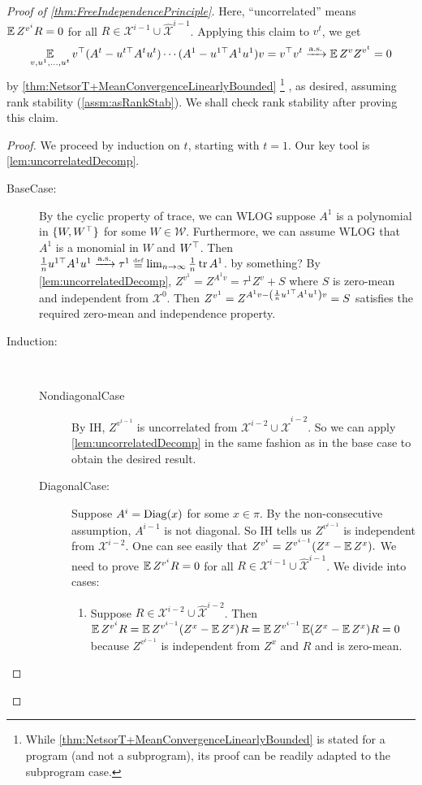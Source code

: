 \documentclass[main.tex]{subfiles}
\begin{document}
\begin{proof}[Proof of \cref{thm:FreeIndependencePrinciple}]
Here, ``uncorrelated'' means $\operatorname*{\mathbb{E}} Z^{v^{i}}R=0$ for all $R\in\mathcal{X}^{i-1}\cup\hat{\mathcal{X}}^{i-1}$. Applying this claim to $v^{t}$, we get
\[
\operatorname*{\mathbb{E}}_{v, u^1, \ldots, u^t} v^{\top}(A^{t}-u^{t\top}A^{t}u^{t})\cdots(A^{1}-u^{1\top}A^{1}u^{1})v=v^{\top}v^{t}\xrightarrow{\mathrm{a.s.}}\operatorname*{\mathbb{E}} Z^{v}Z^{v^{t}}=0
\]
by \cref{thm:NetsorT+MeanConvergenceLinearlyBounded}%
\footnote{
    While \cref{thm:NetsorT+MeanConvergenceLinearlyBounded} is stated for a program (and not a subprogram), its proof can be readily adapted to the subprogram case.
}
, as desired, assuming rank stability (\cref{assm:asRankStab}). We shall check rank stability after proving this claim.
\begin{proof}
We proceed by induction on $t$, starting with $t=1$. Our key tool is \cref{lem:uncorrelatedDecomp}.
\begin{description}
\item [{BaseCase:}] By the cyclic property of trace, we can WLOG suppose $A^{1}$ is a polynomial in $\{W,W^{\top}\}$ for some $W\in\mathcal{W}$. Furthermore, we can assume WLOG that $A^{1}$ is a monomial in $W$ and $W^{\top}$. Then $\frac{1}{n}u^{1\trsp}A^{1}u^{1}\asto\tau^{1}\defeq\lim_{n\to\infty}\frac{1}{n}\tr A^{1}$. by something? By \cref{lem:uncorrelatedDecomp}, $Z^{v^{1}}=Z^{A^{1}v}=\tau^{1}Z^{v}+S$ where $S$ is zero-mean and independent from $\mathcal{X}^{0}$. Then $Z^{v^{1}}=Z^{A^{1}v-\left(\frac{1}{n}u^{1\top}A^{1}u^{1}\right)v}=S$ satisfies the required zero-mean and independence property.
\item [{Induction:}]~
\begin{description}
\item [{NondiagonalCase}] By IH, $Z^{v^{i-1}}$ is uncorrelated from $\mathcal{X}^{i-2}\cup\hat{\mathcal{X}}^{i-2}$. So we can apply \cref{lem:uncorrelatedDecomp} in the same fashion as in the base case to obtain the desired result.
\item [{DiagonalCase:}] Suppose $A^{i}=\mathrm{Diag}(x)$ for some $x\in\pi$. By the non-consecutive assumption, $A^{i-1}$ is not diagonal. So IH tells us $Z^{v^{i-1}}$ is independent from $\mathcal{X}^{i-2}$. One can see easily that $Z^{v^{i}}=Z^{v^{i-1}}(Z^{x}-\operatorname*{\mathbb{E}} Z^{x}).$ We need to prove $\operatorname*{\mathbb{E}} Z^{v^{i}}R=0$ for all $R\in\mathcal{X}^{i-1}\cup\mathcal{\hat{X}}^{i-1}$. We divide into cases:
\begin{enumerate}
\item Suppose $R\in\mathcal{X}^{i-2}\cup\hat{\mathcal{X}}^{i-2}$. Then $\operatorname*{\mathbb{E}} Z^{v^{i}}R=\operatorname*{\mathbb{E}} Z^{v^{i-1}}(Z^{x}-\operatorname*{\mathbb{E}} Z^{x})R=\operatorname*{\mathbb{E}} Z^{v^{i-1}}\operatorname*{\mathbb{E}}(Z^{x}-\operatorname*{\mathbb{E}} Z^{x})R=0$ because $Z^{v^{i-1}}$ is independent from $Z^{x}$ and $R$ and is zero-mean.

\end{enumerate}
\end{description}
\end{description}
\end{proof}
\end{proof}
\end{document}
